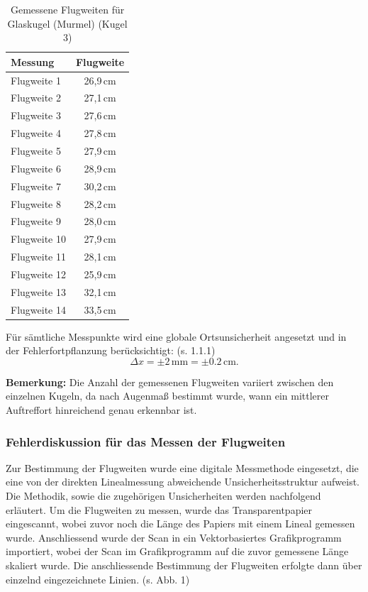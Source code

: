 \documentclass{article}
\begin{document}
\begin{table}[htpb]
    \centering
    \caption{Gemessene Flugweiten für Glaskugel (Murmel) (Kugel 3)}
    \vspace{.2cm}
    \label{tab:flugweiten3}
    \begin{tabular}{lc}
        \toprule
        \textbf{Messung} & \textbf{Flugweite} \\
        \midrule
        Flugweite 1  & 26{,}9\,cm \\
        Flugweite 2  & 27{,}1\,cm \\
        Flugweite 3  & 27{,}6\,cm \\
        Flugweite 4  & 27{,}8\,cm \\
        Flugweite 5  & 27{,}9\,cm \\
        Flugweite 6  & 28{,}9\,cm \\
        Flugweite 7  & 30{,}2\,cm \\
        Flugweite 8  & 28{,}2\,cm \\
        Flugweite 9  & 28{,}0\,cm \\
        Flugweite 10 & 27{,}9\,cm \\
        Flugweite 11 & 28{,}1\,cm \\
        Flugweite 12 & 25{,}9\,cm \\
        Flugweite 13 & 32{,}1\,cm \\
        Flugweite 14 & 33{,}5\,cm \\
        \bottomrule
    \end{tabular}
\end{table}

\FloatBarrier

\noindent Für sämtliche Messpunkte wird eine globale Ortsunsicherheit angesetzt und in der Fehlerfortpflanzung berücksichtigt: (s. 1.1.1)
\[
    \Delta x = \pm 2\,\mathrm{mm} = \pm 0.2\,\mathrm{cm}.
\]

\noindent\textbf{Bemerkung:} Die Anzahl der gemessenen Flugweiten variiert zwischen den einzelnen Kugeln, 
da nach Augenmaß bestimmt wurde, wann ein mittlerer Auftreffort hinreichend genau erkennbar ist.


\subsubsection{Fehlerdiskussion für das Messen der Flugweiten}
Zur Bestimmung der Flugweiten wurde eine digitale Messmethode eingesetzt, die eine von der direkten Linealmessung abweichende Unsicherheitsstruktur aufweist. Die Methodik, sowie die zugehörigen Unsicherheiten werden nachfolgend erläutert. 
\noindent Um die Flugweiten zu messen, wurde das Transparentpapier eingescannt, wobei zuvor noch die Länge des Papiers mit einem Lineal gemessen wurde. Anschliessend wurde der Scan in ein Vektorbasiertes Grafikprogramm importiert, wobei der Scan im Grafikprogramm auf die zuvor gemessene Länge skaliert wurde. Die anschliessende Bestimmung der Flugweiten erfolgte dann über einzelnd eingezeichnete Linien. (s. Abb. 1) 
\end{document}
